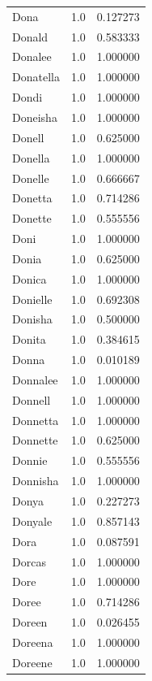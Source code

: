 \documentclass[
  letterpaper,
  DIV=11,
  numbers=noendperiod]{scrreprt}
\begin{document}
\begin{tabular}{lrr}
Dona            &   1.0 &   0.127273 \\
Donald          &   1.0 &   0.583333 \\
Donalee         &   1.0 &   1.000000 \\
Donatella       &   1.0 &   1.000000 \\
Dondi           &   1.0 &   1.000000 \\
Doneisha        &   1.0 &   1.000000 \\
Donell          &   1.0 &   0.625000 \\
Donella         &   1.0 &   1.000000 \\
Donelle         &   1.0 &   0.666667 \\
Donetta         &   1.0 &   0.714286 \\
Donette         &   1.0 &   0.555556 \\
Doni            &   1.0 &   1.000000 \\
Donia           &   1.0 &   0.625000 \\
Donica          &   1.0 &   1.000000 \\
Donielle        &   1.0 &   0.692308 \\
Donisha         &   1.0 &   0.500000 \\
Donita          &   1.0 &   0.384615 \\
Donna           &   1.0 &   0.010189 \\
Donnalee        &   1.0 &   1.000000 \\
Donnell         &   1.0 &   1.000000 \\
Donnetta        &   1.0 &   1.000000 \\
Donnette        &   1.0 &   0.625000 \\
Donnie          &   1.0 &   0.555556 \\
Donnisha        &   1.0 &   1.000000 \\
Donya           &   1.0 &   0.227273 \\
Donyale         &   1.0 &   0.857143 \\
Dora            &   1.0 &   0.087591 \\
Dorcas          &   1.0 &   1.000000 \\
Dore            &   1.0 &   1.000000 \\
Doree           &   1.0 &   0.714286 \\
Doreen          &   1.0 &   0.026455 \\
Doreena         &   1.0 &   1.000000 \\
Doreene         &   1.0 &   1.000000 \\

\end{tabular}
\end{document}
